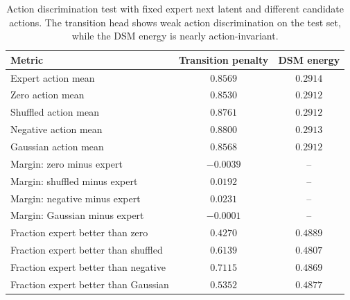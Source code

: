 \begin{table}[h]
\centering
\small
\caption{Action discrimination test with fixed expert next latent and different candidate actions. 
The transition head shows weak action discrimination on the test set, while the DSM energy is nearly action-invariant.}
\label{tab:action_discrimination_test}
\begin{tabular}{lcc}
\toprule
Metric & Transition penalty & DSM energy \\
\midrule
Expert action mean & \(0.8569\) & \(0.2914\) \\
Zero action mean & \(0.8530\) & \(0.2912\) \\
Shuffled action mean & \(0.8761\) & \(0.2912\) \\
Negative action mean & \(0.8800\) & \(0.2913\) \\
Gaussian action mean & \(0.8568\) & \(0.2912\) \\
\midrule
Margin: zero minus expert & \(-0.0039\) & -- \\
Margin: shuffled minus expert & \(0.0192\) & -- \\
Margin: negative minus expert & \(0.0231\) & -- \\
Margin: Gaussian minus expert & \(-0.0001\) & -- \\
\midrule
Fraction expert better than zero & \(0.4270\) & \(0.4889\) \\
Fraction expert better than shuffled & \(0.6139\) & \(0.4807\) \\
Fraction expert better than negative & \(0.7115\) & \(0.4869\) \\
Fraction expert better than Gaussian & \(0.5352\) & \(0.4877\) \\
\bottomrule
\end{tabular}
\end{table}